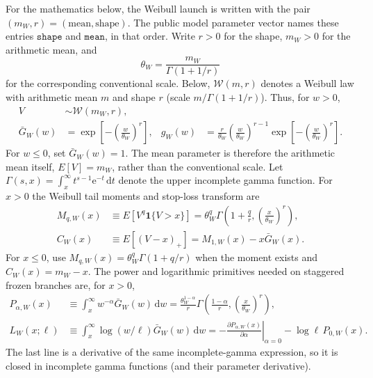 \documentclass[12pt]{article}
\newcommand{\dd}{\,\mathrm{d}}
\newcommand{\Gbar}{\bar{G}}
\newcommand{\e}{\mathrm{e}}
\theoremstyle{remark}
\begin{document}
For the mathematics below, the Weibull launch is written with the pair $(m_W,r)=(\text{mean},\text{shape})$. The public model parameter vector names these entries $\texttt{shape}$ and $\texttt{mean}$, in that order. Write $r>0$ for the shape, $m_W>0$ for the arithmetic mean, and
\begin{equation}
  \theta_W = \frac{m_W}{\Gamma(1+1/r)}
\end{equation}
for the corresponding conventional scale. Below, $\mathcal W(m,r)$ denotes a Weibull law with arithmetic mean $m$ and shape $r$ (scale $m/\Gamma(1+1/r)$). Thus, for $w>0$,
\begin{align}
  V &\sim \mathcal W(m_W,r), \\
  \Gbar_W(w) &= \exp\!\left[-\left(\frac{w}{\theta_W}\right)^r\right],
  &g_W(w) &= \frac{r}{\theta_W}\left(\frac{w}{\theta_W}\right)^{r-1}
             \exp\!\left[-\left(\frac{w}{\theta_W}\right)^r\right].
  \label{eq:weibull-launch}
\end{align}
For $w\le0$, set $\Gbar_W(w)=1$. The mean parameter is therefore the arithmetic mean itself, $E[V]=m_W$, rather than the conventional scale. Let $\Gamma(s,x)=\int_x^\infty t^{s-1}\e^{-t}\dd t$ denote the upper incomplete gamma function. For $x>0$ the Weibull tail moments and stop-loss transform are
\begin{align}
  M_{q,W}(x)
    &\equiv E\!\left[V^q\mathbf 1\{V>x\}\right]
      =\theta_W^q\Gamma\!\left(1+\frac{q}{r},
                         \left(\frac{x}{\theta_W}\right)^r\right), \\
  C_W(x)
    &\equiv E[(V-x)_+]
      =M_{1,W}(x)-x\Gbar_W(x).
  \label{eq:weibull-tail-moments}
\end{align}
For $x\le0$, use $M_{q,W}(x)=\theta_W^q\Gamma(1+q/r)$ when the moment exists and $C_W(x)=m_W-x$. The power and logarithmic primitives needed on staggered frozen branches are, for $x>0$,
\begin{align}
  P_{\alpha,W}(x)
    &\equiv \int_x^\infty w^{-\alpha}\Gbar_W(w)\dd w
      =\frac{\theta_W^{1-\alpha}}{r}
        \Gamma\!\left(\frac{1-\alpha}{r},
                    \left(\frac{x}{\theta_W}\right)^r\right), \\
  L_W(x;\ell)
    &\equiv \int_x^\infty\log(w/\ell)\Gbar_W(w)\dd w
      =-\left.\frac{\partial P_{\alpha,W}(x)}{\partial\alpha}\right|_{\alpha=0}
        -\log\ell\,P_{0,W}(x).
  \label{eq:weibull-power-primitives}
\end{align}
The last line is a derivative of the same incomplete-gamma expression, so it is closed in incomplete gamma functions (and their parameter derivative).
\end{document}
